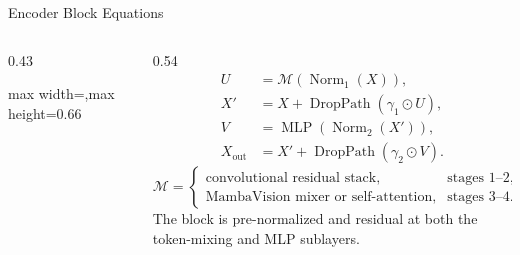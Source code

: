 \begin{frame}{Encoder Block Equations}
\begin{columns}[T,onlytextwidth]
\begin{column}{0.43\textwidth}
\begin{adjustbox}{max width=\textwidth,max height=0.66\textheight}
            \end{adjustbox}
        \end{column}
        \begin{column}{0.54\textwidth}
            \begin{align*}
            U &= \mathcal{M}(\operatorname{Norm}_1(X)),\\
            X' &= X+\operatorname{DropPath}(\gamma_1\odot U),\\
            V &= \operatorname{MLP}(\operatorname{Norm}_2(X')),\\
            X_{\mathrm{out}} &= X'+\operatorname{DropPath}(\gamma_2\odot V).
            \end{align*}
            \vspace{-0.2em}
            \scriptsize
            \[
            \mathcal{M}=
            \begin{cases}
            \text{convolutional residual stack}, & \text{stages 1--2},\\
            \text{MambaVision mixer or self-attention}, & \text{stages 3--4}.
            \end{cases}
            \]
            The block is pre-normalized and residual at both the token-mixing and MLP sublayers.
        \end{column}
    \end{columns}
\end{frame}

